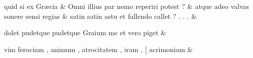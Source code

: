 \documentclass[12pt,onecolumn,twoside,a4paper]{memoir}
\begin{document}
               \begin{pairs}
                  \begin{Leftside}
			\beginnumbering
			\setcounter{stanzaL}{0}
                     
                         \stanza {}quid
                              si
                              ex
                              Græcia & 
                     Omni
                              illius
                              par
                              nemo
                              reperiri
                              potest
                              ? \&
                         \stanza {}
                     atque
                              adeo
                              valvas
                              sonere
                              sensi
                              regias \&
                         \stanza {}
                     satin
                              {satin}
                              astu
                              et
                              fallendo
                              callet
                              ?
                              .
                              .
                              . \&
                         \stanza {}
                     
                              dolet
                              pudetque
                              {pudetque}
                              Graium
                              me
                              et
                              vero
                              piget \&
                         \stanza {}
                     
                              vim
                              ferociam
                              ,
                              animum
                              ,
                              atrocitatem
                              ,
                              iram
                              ,
                              [
                              acrimoniam \&
                         \stanza {}
                     

\end{Leftside}
\end{pairs}
\end{document}
